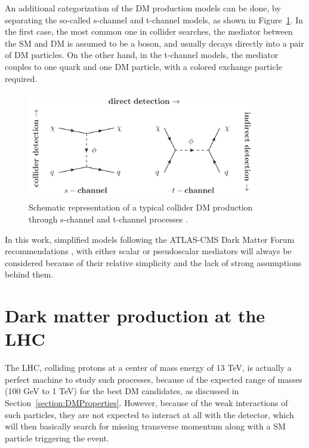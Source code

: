 \documentclass[a4paper, 10pt, openright]{report}
\begin{document}
An additional categorization of the \ac{DM} production models can be done, by separating the so-called s-channel and t-channel models, as shown in Figure~\ref{fig:STChannels}. In the first case, the most common one in collider searches, the mediator between the \ac{SM} and \ac{DM} is assumed to be a boson, and usually decays directly into a pair of \ac{DM} particles. On the other hand, in the t-channel models, the mediator couples to one quark and one \ac{DM} particle, with a colored exchange particle required.

\begin{figure}[htbp]
\begin{center}
\includegraphics[width=10cm, height=4.7cm]{figs/STChannels.png}
\caption{Schematic representation of a typical collider \ac{DM} production through s-channel and t-channel processes \cite{STChannels}.}
\label{fig:STChannels}
\end{center}
\end{figure}

In this work, simplified models following the ATLAS-CMS Dark Matter Forum recommendations \cite{Forum}, with either scalar or pseudoscalar mediators will always be considered because of their relative simplicity and the lack of strong assumptions behind them.%

\section{Dark matter production at the \acf{LHC}} \label{section:ourChannel}

The \ac{LHC}, colliding protons at a center of mass energy of 13 TeV, is actually a perfect machine to study such processes, because of the expected range of masses (100 GeV to 1 TeV) for the best \ac{DM} candidates, as discussed in Section~\ref{section:DMProperties}. However, because of the weak interactions of such particles, they are not expected to interact at all with the detector, which will then basically search for missing transverse momentum along with a \ac{SM} particle triggering the event.
\end{document}
